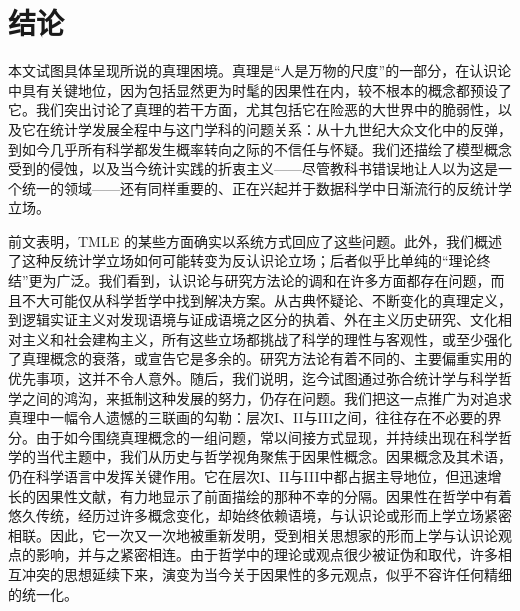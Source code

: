 \section{结论}

本文试图具体呈现所说的真理困境。真理是“人是万物的尺度”的一部分，在认识论中具有关键地位，因为包括显然更为时髦的因果性在内，较不根本的概念都预设了它。我们突出讨论了真理的若干方面，尤其包括它在险恶的大世界中的脆弱性，以及它在统计学发展全程中与这门学科的问题关系：从十九世纪大众文化中的反弹，到如今几乎所有科学都发生概率转向之际的不信任与怀疑。我们还描绘了模型概念受到的侵蚀，以及当今统计实践的折衷主义——尽管教科书错误地让人以为这是一个统一的领域——还有同样重要的、正在兴起并于数据科学中日渐流行的反统计学立场。

前文表明，TMLE 的某些方面确实以系统方式回应了这些问题。此外，我们概述了这种反统计学立场如何可能转变为反认识论立场；后者似乎比单纯的“理论终结”更为广泛。我们看到，认识论与研究方法论的调和在许多方面都存在问题，而且不大可能仅从科学哲学中找到解决方案。从古典怀疑论、不断变化的真理定义，到逻辑实证主义对发现语境与证成语境之区分的执着、外在主义历史研究、文化相对主义和社会建构主义，所有这些立场都挑战了科学的理性与客观性，或至少强化了真理概念的衰落，或宣告它是多余的。研究方法论有着不同的、主要偏重实用的优先事项，这并不令人意外。随后，我们说明，迄今试图通过弥合统计学与科学哲学之间的鸿沟，来抵制这种发展的努力，仍存在问题。我们把这一点推广为对追求真理中一幅令人遗憾的三联画的勾勒：层次I、II与III之间，往往存在不必要的界分。由于如今围绕真理概念的一组问题，常以间接方式显现，并持续出现在科学哲学的当代主题中，我们从历史与哲学视角聚焦于因果性概念。因果概念及其术语，仍在科学语言中发挥关键作用。它在层次I、II与III中都占据主导地位，但迅速增长的因果性文献，有力地显示了前面描绘的那种不幸的分隔。因果性在哲学中有着悠久传统，经历过许多概念变化，却始终依赖语境，与认识论或形而上学立场紧密相联。因此，它一次又一次地被重新发明，受到相关思想家的形而上学与认识论观点的影响，并与之紧密相连。由于哲学中的理论或观点很少被证伪和取代，许多相互冲突的思想延续下来，演变为当今关于因果性的多元观点，似乎不容许任何精细的统一化。

